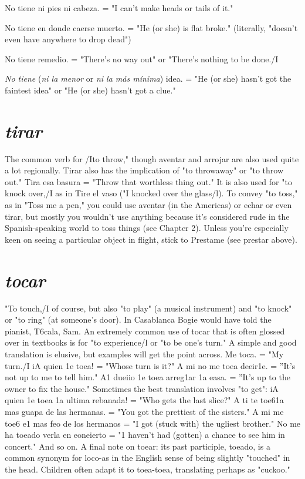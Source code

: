 \documentclass[14pt,a4paper,oneside]{memoir}
\newcommand{\indu}{\hspace{20pt}}
\begin{document}
\indu No tiene ni pies ni cabeza. = "I can't make heads or tails of it."

\indu No tiene en donde caerse muerto. = "He (or she) is flat
broke."
(literally, "doesn't even have anywhere to drop dead")

\indu No tiene remedio. = "There's no way out" or "There's nothing to be done./I

\indu \emph{No tiene} (\emph{ni la menor} or \emph{ni la más mínima}) idea. = "He (or
she) hasn't got the faintest idea" or "He (or she) hasn't
got a clue."

\section{\emph{tirar}}

The common verb for /Ito throw," though aventar and arrojar
are also used quite a lot regionally. Tirar also has the implication of
"to throwaway" or "to throw out." Tira esa basura = "Throw that
worthless thing out." It is also used for "to knock over,/I as in Tire el
vaso ("I knocked over the glass/l). To convey "to toss," as in "Toss me
a pen," you could use aventar (in the Americas) or echar or even tirar,
but mostly you wouldn't use anything because it's considered rude
in the Spanish-speaking world to toss things (see Chapter 2). Unless
you're especially keen on seeing a particular object in flight, stick to
Prestame (see prestar above).

\section{\emph{tocar}}

"To touch,/I of course, but also "to play" (a musical instrument) and "to knock" or "to ring" (at someone's door). In Casablanca
Bogie would have told the pianist, T6cala, Sam. An extremely common use of tocar that is often glossed over in textbooks is for "to experience/l or "to be one's turn." A simple and good translation is elusive,
but examples will get the point across. Me toca. = "My turn./I iA
quien 1e toea! = "Whose turn is it?" A mi no me toea deeir1e. = ''It's
not up to me to tell him." A1 dueiio 1e toea arreg1ar 1a easa. = ''It's
up to the owner to fix the house." Sometimes the best translation involves "to get": iA quien 1e toea 1a ultima rebanada! = "Who gets the
last slice?" A ti te toe61a mas guapa de las hermanas. = "You got the
prettiest of the sisters." A mi me toe6 e1 mas feo de los hermanos =
"I got (stuck with) the ugliest brother." No me ha toeado verla en eoneierto = "1 haven't had (gotten) a chance to see him in concert." And
so on. A final note on toear: its past participle, toeado, is a common
synonym for loco-as in the English sense of being slightly "touched"
in the head. Children often adapt it to toea-toea, translating perhaps as
"cuckoo."
\end{document}
